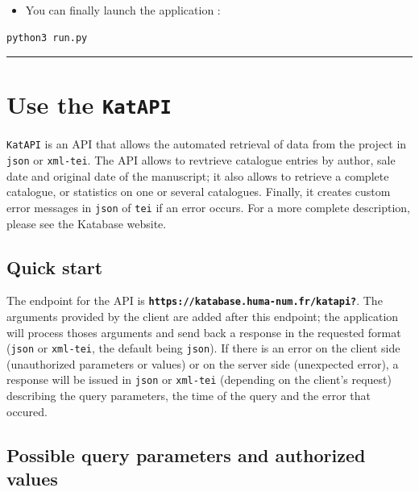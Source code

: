 \begin{itemize}
\item You can finally launch the application : 
\end{itemize}

\begin{listing}[h!]
   \begin{verbatim}
python3 run.py

   \end{verbatim}
\end{listing}

\par\noindent\rule{\linewidth}{0.4pt}
\section*{Use the \texttt{KatAPI}}

\texttt{KatAPI} is an API that allows the automated retrieval of data from the project in 
\texttt{json} or \texttt{xml-tei}. The API allows to revtrieve catalogue entries by author, sale date
and original date of the manuscript; it also allows to retrieve a complete catalogue, or
statistics on one or several catalogues. Finally, it creates custom error messages in \texttt{json}
of \texttt{tei} if an error occurs. For a more complete description, please see the Katabase website.
\subsection*{Quick start}

The endpoint for the API is \textbf{\texttt{https://katabase.huma-num.fr/katapi?}}. The arguments 
provided by the client are added after this endpoint; the application will process
thoses arguments and send back a response in the requested format (\texttt{json} or \texttt{xml-tei},
the default being \texttt{json}). If there is an error on the client side (unauthorized 
parameters or values) or on the server side (unexpected error), a response will be
issued in \texttt{json} or \texttt{xml-tei} (depending on the client's request) describing the 
query parameters, the time of the query and the error that occured.
\subsection*{Possible query parameters and authorized values}

